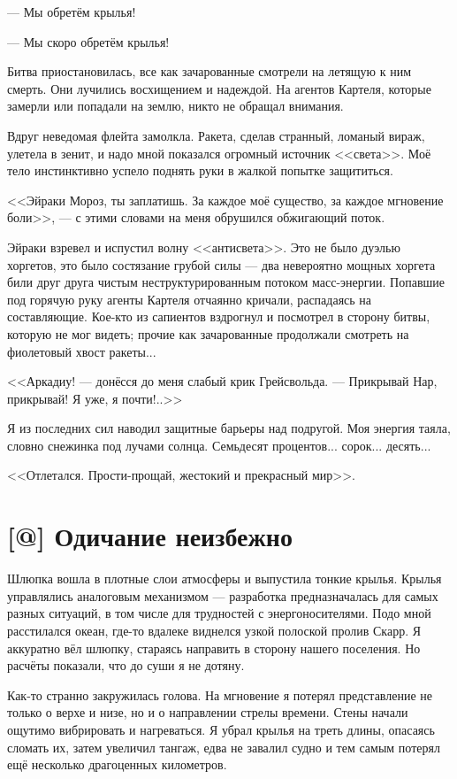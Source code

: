 --- Мы обретём крылья!

--- Мы скоро обретём крылья!

Битва приостановилась, все как зачарованные смотрели на летящую к ним смерть.
Они лучились восхищением и надеждой.
На агентов Картеля, которые замерли или попадали на землю, никто не обращал внимания.

Вдруг неведомая флейта замолкла.
Ракета, сделав странный, ломаный вираж, улетела в зенит, и надо мной показался огромный источник <<света>>.
Моё тело инстинктивно успело поднять руки в жалкой попытке защититься.

<<Эйраки Мороз, ты заплатишь.
За каждое моё существо, за каждое мгновение боли>>, --- с этими словами на меня обрушился обжигающий поток.

Эйраки взревел и испустил волну <<антисвета>>.
Это не было дуэлью хоргетов, это было состязание грубой силы --- два невероятно мощных хоргета били друг друга чистым неструктурированным потоком масс-энергии.
Попавшие под горячую руку агенты Картеля отчаянно кричали, распадаясь на составляющие.
Кое-кто из сапиентов вздрогнул и посмотрел в сторону битвы, которую не мог видеть;
прочие как зачарованные продолжали смотреть на фиолетовый хвост ракеты...

<<Аркадиу! --- донёсся до меня слабый крик Грейсвольда.
--- Прикрывай Нар, прикрывай!
Я уже, я почти!..>>

Я из последних сил наводил защитные барьеры над подругой.
Моя энергия таяла, словно снежинка под лучами солнца.
Семьдесят процентов... сорок... десять...

<<Отлетался.
Прости-прощай, жестокий и прекрасный мир>>.

\section{[@] Одичание неизбежно}

Шлюпка вошла в плотные слои атмосферы и выпустила тонкие крылья.
Крылья управлялись аналоговым механизмом --- разработка предназначалась для самых разных ситуаций, в том числе для трудностей с энергоносителями.
Подо мной расстилался океан, где-то вдалеке виднелся узкой полоской пролив Скарр.
Я аккуратно вёл шлюпку, стараясь направить в сторону нашего поселения.
Но расчёты показали, что до суши я не дотяну.

Как-то странно закружилась голова.
На мгновение я потерял представление не только о верхе и низе, но и о направлении стрелы времени.
Стены начали ощутимо вибрировать и нагреваться.
Я убрал крылья на треть длины, опасаясь сломать их, затем увеличил тангаж, едва не завалил судно и тем самым потерял ещё несколько драгоценных километров.

